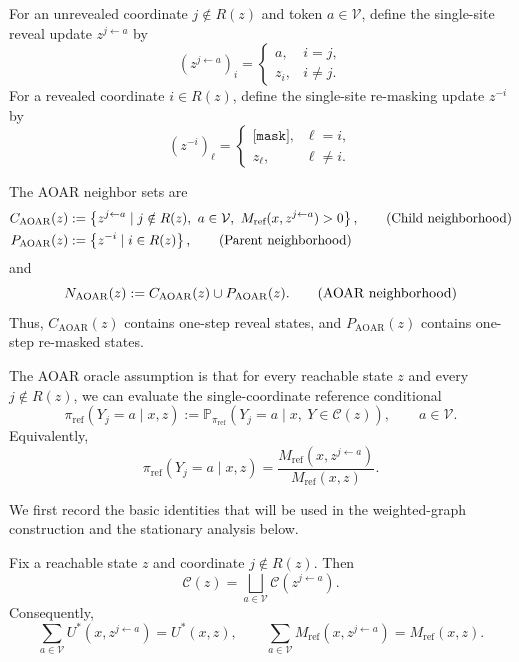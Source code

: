 \documentclass{article}
\numberwithin{theorem}{section}
\numberwithin{proposition}{section}
\numberwithin{corollary}{section}
\numberwithin{lemma}{section}
\numberwithin{conjecture}{section}
\numberwithin{remark}{section}
\numberwithin{definition}{section}
\numberwithin{assumption}{section}
\numberwithin{example}{section}
\newcommand{\calC}{{\mathcal{C}}}
\newcommand{\calV}{{\mathcal{V}}}
\newcommand{\bbP}{\mathbb{P}}
\newcommand{\mbra}[1]{\left\{#1\right\}}
\newcommand{\sbra}[1]{\left(#1\right)}
\providecommand{\mask}{\texttt{[mask]}}
\providecommand{\base}{\pi_{\mathrm{ref}}}
\begin{document}
For an unrevealed coordinate $j\notin R(z)$ and token $a\in\calV$, define the single-site reveal update $z^{j\leftarrow a}$ by
\begin{equation*}
    \sbra{z^{j\leftarrow a}}_i = \begin{cases}
        a, & i=j,\\
        z_i, & i\neq j.
    \end{cases}
\end{equation*}
For a revealed coordinate $i\in R(z)$, define the single-site re-masking update $z^{-i}$ by
\begin{equation*}
    \sbra{z^{-i}}_\ell = \begin{cases}
        \mask, & \ell=i,\\
        z_\ell, & \ell\neq i.
    \end{cases}
\end{equation*}

The AOAR neighbor sets are
\begin{align*}
    C_{\mathrm{AOAR}}(z) &:= \mbra{ z^{j\leftarrow a} \mid j\notin R(z),\ a\in\calV,\ M_{\text{ref}}(x,z^{j\leftarrow a})>0 }, \tag{\text{Child neighborhood}} \\
    P_{\mathrm{AOAR}}(z) &:= \mbra{ z^{-i} \mid i\in R(z) }, \tag{\text{Parent neighborhood}}
\end{align*}
and
\begin{equation*}
    N_{\mathrm{AOAR}}(z) := C_{\mathrm{AOAR}}(z)\cup P_{\mathrm{AOAR}}(z). \tag{\text{AOAR neighborhood}}
\end{equation*}
Thus, $C_{\mathrm{AOAR}}(z)$ contains one-step reveal states, and $P_{\mathrm{AOAR}}(z)$ contains one-step re-masked states.

The AOAR oracle assumption is that for every reachable state $z$ and every $j\notin R(z)$, we can evaluate the single-coordinate reference conditional
\begin{equation*}
    \base(Y_j=a\mid x,z) := \bbP_{\base} \sbra{ Y_j=a \mid x,\ Y\in\calC(z) }, \qquad a\in\calV.
\end{equation*}
Equivalently,
\begin{equation*}
    \base(Y_j=a\mid x,z) = \frac{M_{\text{ref}}(x,z^{j\leftarrow a})}{M_{\text{ref}}(x,z)}.
\end{equation*}

We first record the basic identities that will be used in the weighted-graph construction and the stationary analysis below.

\begin{lemma}
\label{lem:aoar_partition}
Fix a reachable state $z$ and coordinate $j\notin R(z)$. Then
\begin{equation*}
    \calC(z) = \bigsqcup_{a\in\calV} \calC(z^{j\leftarrow a}).
\end{equation*}
Consequently,
\begin{equation*}
    \sum_{a\in\calV} U^*(x,z^{j\leftarrow a}) = U^*(x,z), \qquad \sum_{a\in\calV} M_{\text{ref}}(x,z^{j\leftarrow a}) = M_{\text{ref}}(x,z).
\end{equation*}
\end{lemma}
\end{document}
